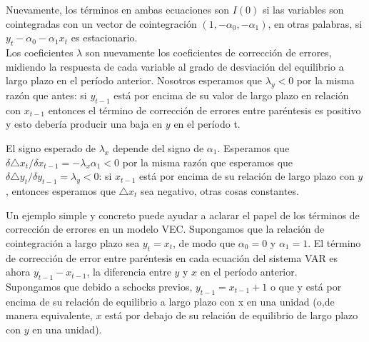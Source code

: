	
	Nuevamente, los t\'erminos en ambas ecuaciones son $I(0)$ si las variables son
	cointegradas con un vector de cointegraci\'on $(1, - \alpha_0, - \alpha_1)$, en otras palabras, si $y_t - \alpha_0 - \alpha_1x_t$ es estacionario.\\
	\vspace{4mm}	
	Los coeficientes $\lambda$ son nuevamente los coeficientes de correcci\'on de errores, midiendo la respuesta de cada variable al grado de desviaci\'on del equilibrio a largo plazo en el per\'{i}odo anterior. Nosotros esperamos que $\lambda_y < 0$ por la misma raz\'on que antes: si $y_{t -1}$ est\'a por encima de su valor de largo plazo en relaci\'on con $x_{t -1}$ entonces el t\'ermino de correcci\'on de errores entre par\'entesis es positivo y esto deber\'{i}a producir una baja en $y$ en el per\'{i}odo t. 
	

	
	
	El signo esperado de $\lambda_x$ depende del signo de $\alpha_1$. Esperamos que $ \delta \triangle x_t / \delta x_{t-1} = - \lambda_x \alpha_1 < 0$ por la misma raz\'on que esperamos que $\delta \triangle y_t / \delta y_{t-1} = \lambda_y < 0$: si $x_{t-1}$ est\'a por encima de su relaci\'on de largo plazo con $y$, entonces esperamos que $\triangle x_t$ sea negativo, otras cosas constantes.
	

	
	
	Un ejemplo simple y concreto puede ayudar a aclarar el papel de los t\'erminos de correcci\'on de errores en un modelo VEC. Supongamos que la relaci\'on de cointegraci\'on a largo plazo sea $y_t = x_t$, de modo que $\alpha_0 = 0$ y $\alpha_1 = 1$. El t\'ermino de correcci\'on de error entre par\'entesis en cada ecuaci\'on del sistema VAR es ahora $y_{t -1} - x_{t -1}$, la diferencia entre $y$ y $x$ en el per\'{i}odo anterior. \\
	Supongamos que debido a schocks previos, $y_{t -1} = x_{t -1} + 1$ o que y está por encima de su relaci\'on de equilibrio a largo plazo con x en una unidad (o,de manera equivalente, $x$ est\'a por debajo de su relaci\'on de equilibrio de largo plazo con $y$ en una unidad). \\
	
